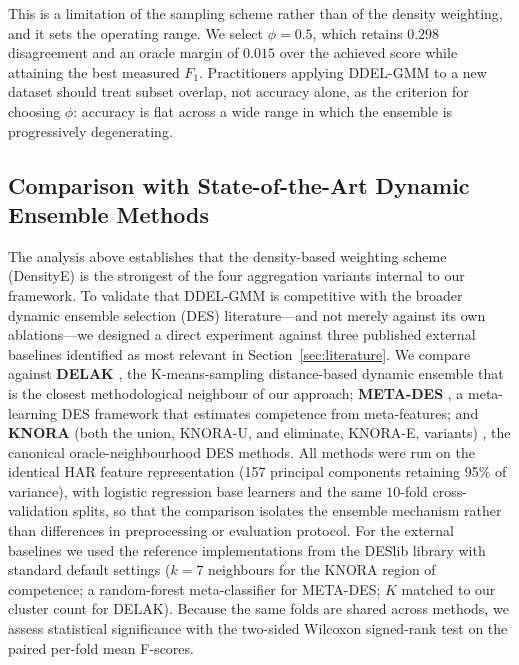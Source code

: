 \documentclass[lettersize,journal]{IEEEtran}
\begin{document}
	This is a limitation of the sampling scheme rather than of the density weighting, and it
	sets the operating range. We select $\phi = 0.5$, which retains $0.298$ disagreement and
	an oracle margin of $0.015$ over the achieved score while attaining the best measured
	$F_1$. Practitioners applying DDEL-GMM to a new dataset should treat subset overlap, not
	accuracy alone, as the criterion for choosing $\phi$: accuracy is flat across a wide
	range in which the ensemble is progressively degenerating.

	

	\subsection{Comparison with State-of-the-Art Dynamic Ensemble Methods}
	
	\noindent The analysis above establishes that the density-based weighting scheme (DensityE) is the strongest of the four aggregation variants internal to our framework. To validate that DDEL-GMM is competitive with the broader dynamic ensemble selection (DES) literature—and not merely against its own ablations—we designed a direct experiment against three published external baselines identified as most relevant in Section~\ref{sec:literature}. We compare against \textbf{DELAK} \cite{guo_dynamic_2021}, the K-means-sampling distance-based dynamic ensemble that is the closest methodological neighbour of our approach; \textbf{META-DES} \cite{cruz_meta-oracle_2017}, a meta-learning DES framework that estimates competence from meta-features; and \textbf{KNORA} (both the union, KNORA-U, and eliminate, KNORA-E, variants) \cite{ko_dynamic_2008}, the canonical oracle-neighbourhood DES methods. All methods were run on the identical HAR feature representation (157 principal components retaining 95\% of variance), with logistic regression base learners and the same $10$-fold cross-validation splits, so that the comparison isolates the ensemble mechanism rather than differences in preprocessing or evaluation protocol. For the external baselines we used the reference implementations from the DESlib library with standard default settings ($k=7$ neighbours for the KNORA region of competence; a random-forest meta-classifier for META-DES; $K$ matched to our cluster count for DELAK). Because the same folds are shared across methods, we assess statistical significance with the two-sided Wilcoxon signed-rank test on the paired per-fold mean F-scores.
	
\end{document}
